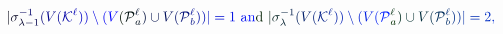 \documentclass[12pt]{article}
\begin{document}
\makeatletter
\renewcommand*{\@textcolor}[3]{%
  \protect\leavevmode
  \begingroup
    \color#1{#2}#3%
  \endgroup
}
\makeatother
\begin{displaymath}
\mathcolor[RGB]{0,0,15}{|} \mathcolor[RGB]{0,0,30}{\sigma} _ { \mathcolor[RGB]{0,0,45}{\lambda} \mathcolor[RGB]{0,0,60}{-} \mathcolor[RGB]{0,0,75}{1} } ^ { \mathcolor[RGB]{0,0,90}{-} \mathcolor[RGB]{0,0,105}{1} } \mathcolor[RGB]{0,0,120}{(} \mathcolor[RGB]{0,0,135}{V} \mathcolor[RGB]{0,0,150}{(} \mathcal { \mathcolor[RGB]{0,0,165}{K} } ^ { \mathcolor[RGB]{0,0,180}{\ell} } \mathcolor[RGB]{0,0,195}{)} \mathcolor[RGB]{0,0,210}{)} \mathcolor[RGB]{0,0,225}{\setminus} \mathcolor[RGB]{0,0,240}{(} \mathcolor[RGB]{0,0,255}{V} \mathcolor[RGB]{0,15,0}{(} \mathcal { \mathcolor[RGB]{0,15,15}{P} } _ { \mathcolor[RGB]{0,15,30}{a} } ^ { \mathcolor[RGB]{0,15,45}{\ell} } \mathcolor[RGB]{0,15,60}{)} \mathcolor[RGB]{0,15,75}{\cup} \mathcolor[RGB]{0,15,90}{V} \mathcolor[RGB]{0,15,105}{(} \mathcal { \mathcolor[RGB]{0,15,120}{P} } _ { \mathcolor[RGB]{0,15,135}{b} } ^ { \mathcolor[RGB]{0,15,150}{\ell} } \mathcolor[RGB]{0,15,165}{)} \mathcolor[RGB]{0,15,180}{)} \mathcolor[RGB]{0,15,195}{|} \mathcolor[RGB]{0,15,210}{=} \mathcolor[RGB]{0,15,225}{1} \mathrm { ~ \mathcolor[RGB]{0,15,240}{a} \mathcolor[RGB]{0,15,255}{n} \mathcolor[RGB]{0,30,0}{d} ~ } \mathcolor[RGB]{0,30,15}{|} \mathcolor[RGB]{0,30,30}{\sigma} _ { \mathcolor[RGB]{0,30,45}{\lambda} } ^ { \mathcolor[RGB]{0,30,60}{-} \mathcolor[RGB]{0,30,75}{1} } \mathcolor[RGB]{0,30,90}{(} \mathcolor[RGB]{0,30,105}{V} \mathcolor[RGB]{0,30,120}{(} \mathcal { \mathcolor[RGB]{0,30,135}{K} } ^ { \mathcolor[RGB]{0,30,150}{\ell} } \mathcolor[RGB]{0,30,165}{)} \mathcolor[RGB]{0,30,180}{)} \mathcolor[RGB]{0,30,195}{\setminus} \mathcolor[RGB]{0,30,210}{(} \mathcolor[RGB]{0,30,225}{V} \mathcolor[RGB]{0,30,240}{(} \mathcal { \mathcolor[RGB]{0,30,255}{P} } _ { \mathcolor[RGB]{0,45,0}{a} } ^ { \mathcolor[RGB]{0,45,15}{\ell} } \mathcolor[RGB]{0,45,30}{)} \mathcolor[RGB]{0,45,45}{\cup} \mathcolor[RGB]{0,45,60}{V} \mathcolor[RGB]{0,45,75}{(} \mathcal { \mathcolor[RGB]{0,45,90}{P} } _ { \mathcolor[RGB]{0,45,105}{b} } ^ { \mathcolor[RGB]{0,45,120}{\ell} } \mathcolor[RGB]{0,45,135}{)} \mathcolor[RGB]{0,45,150}{)} \mathcolor[RGB]{0,45,165}{|} \mathcolor[RGB]{0,45,180}{=} \mathcolor[RGB]{0,45,195}{2} \mathcolor[RGB]{0,45,210}{,}
\end{displaymath}
\end{document}
